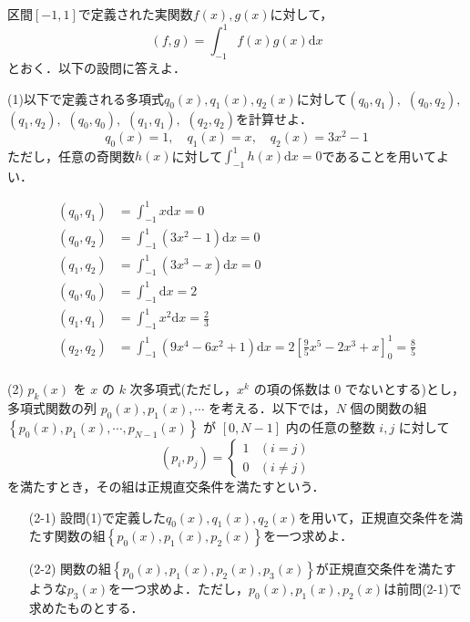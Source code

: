 \documentclass[a4j]{jarticle}
\let \ds \displaystyle
\begin{document}
\section{}

\begin{screen}
 区間$[-1,1]$で定義された実関数$f(x),g(x)$に対して，
 $$(f,g)=\int_{-1}^1f(x)g(x)\mathrm{d}x$$
 とおく．以下の設問に答えよ．
\end{screen}


\begin{screen}
 (1)以下で定義される多項式$q_0(x),q_1(x),q_2(x)$に対して$(q_0,q_1),$ $(q_0,q_2),$ $(q_1,q_2),$ $(q_0,q_0),$ $(q_1,q_1),$ $(q_2,q_2)$を計算せよ．
 $$q_0(x)=1,\quad q_1(x)=x,\quad q_2(x)=3x^2-1$$
 ただし，任意の奇関数$h(x)$に対して$\ds \int_{-1}^1h(x)\mathrm{d}x = 0$であることを用いてよい．
\end{screen}

\begin{align*}
 (q_0,q_1) &= \int_{-1}^1 x \mathrm{d}x = 0 \\
 (q_0,q_2) &= \int_{-1}^1 (3x^2 -1)\mathrm{d}x = 0 \\
 (q_1,q_2) &= \int_{-1}^1 (3x^3 -x)\mathrm{d}x =0 \\
 (q_0,q_0) &= \int_{-1}^1 \mathrm{d}x = 2\\
 (q_1,q_1) &= \int_{-1}^1 x^2\mathrm{d}x =\frac{2}{3}\\
 (q_2,q_2) &= \int_{-1}^1 (9x^4 - 6 x^2 + 1)\mathrm{d}x = 2 \left[\frac{9}{5}x^5-2x^3 + x\right]_0^1 = \frac{8}{5}\\
\end{align*}

\begin{screen}
 (2) $p_k(x)$ を $x$ の $k$ 次多項式(ただし，$x^k$ の項の係数は $0$ でないとする)とし，多項式関数の列 $p_0(x),p_1(x),\cdots$ を考える．以下では，$N$ 個の関数の組 $\left\{p_0(x),p_1(x),\cdots,p_{N-1}(x)\right\}$ が $[0,N-1]$ 内の任意の整数 $i,j$ に対して
 $$(p_i,p_j)=\begin{cases}
              1 &(i=j)\\
              0 &(i \neq j)
             \end{cases}$$
 を満たすとき，その組は正規直交条件を満たすという．
 \begin{itemize}
  \item[(2-1)] 設問(1)で定義した$q_0(x),q_1(x),q_2(x)$を用いて，正規直交条件を満たす関数の組$\left\{p_0(x),p_1(x),p_2(x)\right\}$を一つ求めよ．
  \item[(2-2)] 関数の組$\left\{p_0(x),p_1(x),p_2(x),p_3(x)\right\}$が正規直交条件を満たすような$p_3(x)$を一つ求めよ．ただし，$p_0(x),p_1(x),p_2(x)$は前問(2-1)で求めたものとする．
 \end{itemize}
\end{screen}
\end{document}
